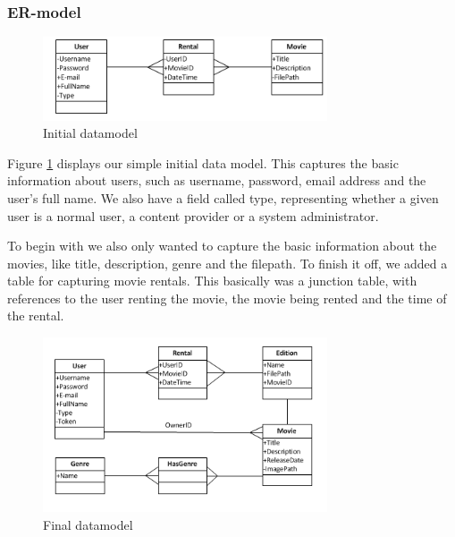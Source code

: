 \subsubsection{ER-model}
\label{Design_Database_Analysis_ERmodel}

\begin{figure}[h!]  
  \centering
    \includegraphics[width=0.75\textwidth]{Parts/Images/Design/Database/Datamodel_Initial}
  \caption{Initial datamodel}
  \label{fig:Design_Database_Analysis_ERmodel_Initial}
\end{figure}

Figure \ref{fig:Design_Database_Analysis_ERmodel_Initial} displays our simple initial data model. This captures the basic information about users, such as username, password, email address and the user's full name. We also have a field called type, representing whether a given user is a normal user, a content provider or a system administrator.

To begin with we also only wanted to capture the basic information about the movies, like title, description, genre and the filepath. To finish it off, we added a table for capturing movie rentals. This basically was a junction table, with references to the user renting the movie, the movie being rented and the time of the rental.

\begin{figure}[h!]  
  \centering
    \includegraphics[width=0.75\textwidth]{Parts/Images/Design/Database/Datamodel_final}
  \caption{Final datamodel}
  \label{fig:Design_Database_Analysis_ERmodel_Final}
\end{figure}

